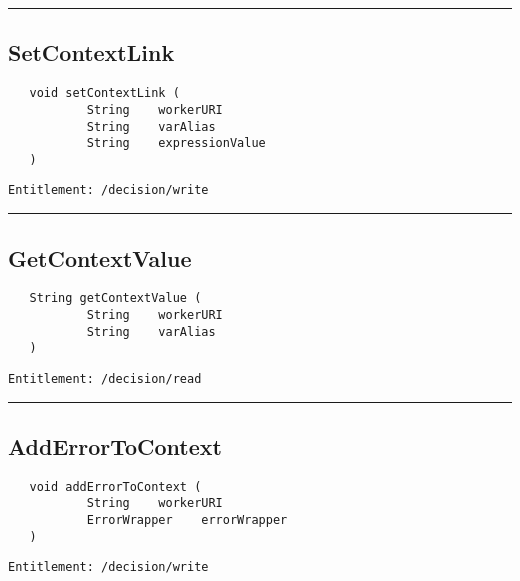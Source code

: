 \rule{12cm}{2pt}
\subsection{SetContextLink}
\label{Api:SetContextLink}
\begin{verbatim}
   void setContextLink (
           String    workerURI
           String    varAlias
           String    expressionValue
   )
\end{verbatim}
\begin{Verbatim}[fontsize=\small, formatcom=\color{Maroon}]
  Entitlement: /decision/write
\end{Verbatim}



\rule{12cm}{2pt}
\subsection{GetContextValue}
\label{Api:GetContextValue}
\begin{verbatim}
   String getContextValue (
           String    workerURI
           String    varAlias
   )
\end{verbatim}
\begin{Verbatim}[fontsize=\small, formatcom=\color{Maroon}]
  Entitlement: /decision/read
\end{Verbatim}



\rule{12cm}{2pt}
\subsection{AddErrorToContext}
\label{Api:AddErrorToContext}
\begin{verbatim}
   void addErrorToContext (
           String    workerURI
           ErrorWrapper    errorWrapper
   )
\end{verbatim}
\begin{Verbatim}[fontsize=\small, formatcom=\color{Maroon}]
  Entitlement: /decision/write
\end{Verbatim}



